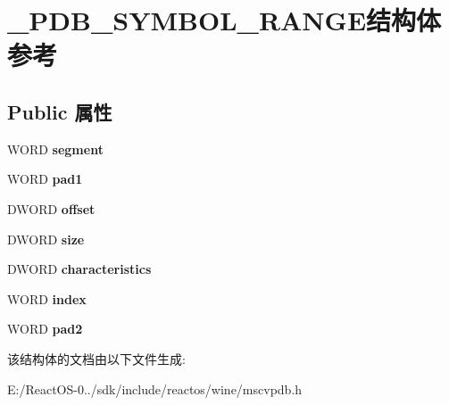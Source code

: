 \hypertarget{struct___p_d_b___s_y_m_b_o_l___r_a_n_g_e}{}\section{\+\_\+\+P\+D\+B\+\_\+\+S\+Y\+M\+B\+O\+L\+\_\+\+R\+A\+N\+G\+E结构体 参考}
\label{struct___p_d_b___s_y_m_b_o_l___r_a_n_g_e}
\subsection*{Public 属性}
\begin{DoxyCompactItemize}
\item 
\mbox{\label{struct___p_d_b___s_y_m_b_o_l___r_a_n_g_e_a011d6720d861ecea2ea6d6308a80d8f8}} 
W\+O\+RD {\bfseries segment}
\item 
\mbox{\label{struct___p_d_b___s_y_m_b_o_l___r_a_n_g_e_ae3bdf3548e028df1bbdab0cea6592778}} 
W\+O\+RD {\bfseries pad1}
\item 
\mbox{\label{struct___p_d_b___s_y_m_b_o_l___r_a_n_g_e_af2bb42c191a3b3f326be5254f34ecb49}} 
D\+W\+O\+RD {\bfseries offset}
\item 
\mbox{\label{struct___p_d_b___s_y_m_b_o_l___r_a_n_g_e_ad9c1af9192e60874de7f8b81bf8a4286}} 
D\+W\+O\+RD {\bfseries size}
\item 
\mbox{\label{struct___p_d_b___s_y_m_b_o_l___r_a_n_g_e_aff2d193f28521f8671544ff04e75135f}} 
D\+W\+O\+RD {\bfseries characteristics}
\item 
\mbox{\label{struct___p_d_b___s_y_m_b_o_l___r_a_n_g_e_a04df9c31af8ab646fa82a782cf8a2591}} 
W\+O\+RD {\bfseries index}
\item 
\mbox{\label{struct___p_d_b___s_y_m_b_o_l___r_a_n_g_e_a99ef7b3fce409ad44c25aed1d1718545}} 
W\+O\+RD {\bfseries pad2}
\end{DoxyCompactItemize}


该结构体的文档由以下文件生成\+:\begin{DoxyCompactItemize}
\item 
E\+:/\+React\+O\+S-\/0../sdk/include/reactos/wine/mscvpdb.\+h\end{DoxyCompactItemize}

